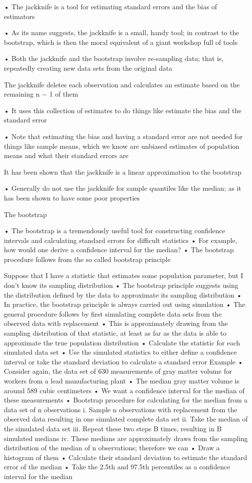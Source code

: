 \documentclass[
]{book}
\begin{document}
• The jackknife is a tool for estimating standard errors and the bias of estimators

• As its name suggests, the jackknife is a small, handy tool; in contrast to the
bootstrap, which is then the moral equivalent of a giant workshop full of tools

• Both the jackknife and the bootstrap involve re-sampling data; that is, repeatedly creating new data sets from the original data

The jackknife deletes each observation and calculates an estimate based on the remaining n − 1 of them

• It uses this collection of estimates to do things like estimate the bias and the standard error

• Note that estimating the bias and having a standard error are not needed for things like sample means, which we know are unbiased estimates of population means and what their standard errors are

It has been shown that the jackknife is a linear approximation to the bootstrap

• Generally do not use the jackknife for sample quantiles like the median; as it has been shown to have some poor properties

The bootstrap

• The bootstrap is a tremendously useful tool for constructing confidence intervals and calculating standard errors for difficult statistics
• For example, how would one derive a confidence interval for the median? • The bootstrap procedure follows from the so called bootstrap principle

Suppose that I have a statistic that estimates some population parameter, but I don't know its sampling distribution
• The bootstrap principle suggests using the distribution defined by the data to approximate its sampling distribution
• In practice, the bootstrap principle is always carried out using simulation
• The general procedure follows by first simulating complete data sets from the observed data with replacement
• This is approximately drawing from the sampling distribution of that statistic, at least as far as the data is able to approximate the true population distribution
• Calculate the statistic for each simulated data set
• Use the simulated statistics to either define a confidence interval or take the standard deviation to calculate a standard error
Example
• Consider again, the data set of 630 measurements of gray matter volume for workers from a lead manufacturing plant
• The median gray matter volume is around 589 cubic centimeters
• We want a confidence interval for the median of these measurements
• Bootstrap procedure for calculating for the median from a data set of n observations
i. Sample n observations with replacement from the observed data resulting in one simulated complete data set
ii. Take the median of the simulated data set
iii. Repeat these two steps B times, resulting in B simulated medians
iv. These medians are approximately draws from the sampling distribution of the
median of n observations; therefore we can
• Draw a histogram of them
• Calculate their standard deviation to estimate the standard error of the median • Take the 2.5th and 97.5th percentiles as a confidence interval for the median
\end{document}
